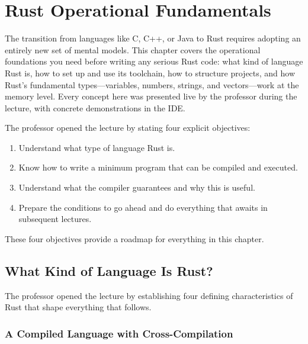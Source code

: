 \chapter{Rust Operational Fundamentals}


The transition from languages like C, C++, or Java to Rust requires adopting an entirely new set of mental models. This chapter covers the operational foundations you need before writing any serious Rust code: what kind of language Rust is, how to set up and use its toolchain, how to structure projects, and how Rust's fundamental types---variables, numbers, strings, and vectors---work at the memory level. Every concept here was presented live by the professor during the lecture, with concrete demonstrations in the IDE.

\begin{insightbox}
The professor opened the lecture by stating four explicit objectives:
\begin{enumerate}
    \item Understand what type of language Rust is.
    \item Know how to write a minimum program that can be compiled and executed.
    \item Understand what the compiler guarantees and why this is useful.
    \item Prepare the conditions to go ahead and do everything that awaits in subsequent lectures.
\end{enumerate}
These four objectives provide a roadmap for everything in this chapter.
\end{insightbox}

\section{What Kind of Language Is Rust?}

The professor opened the lecture by establishing four defining characteristics of Rust that shape everything that follows.

\subsection{A Compiled Language with Cross-Compilation}

